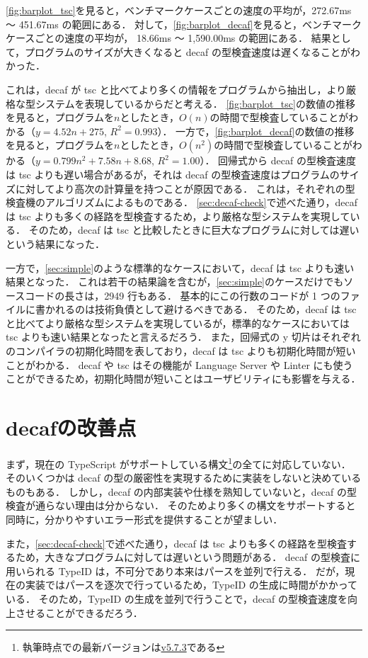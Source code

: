 \ref{fig:barplot_tsc}を見ると，ベンチマークケースごとの速度の平均が，272.67ms 〜 451.67ms の範囲にある．
対して，\ref{fig:barplot_decaf}を見ると，ベンチマークケースごとの速度の平均が， 18.66ms 〜 1,590.00ms の範囲にある．
結果として，プログラムのサイズが大きくなると decaf の型検査速度は遅くなることがわかった．

これは，decaf が tsc と比べてより多くの情報をプログラムから抽出し，より厳格な型システムを表現しているからだと考える．
\ref{fig:barplot_tsc}の数値の推移を見ると，プログラムを$n$としたとき，$O(n)$の時間で型検査していることがわかる（$y = 4.52n + 275$, $R^2 = 0.993$）．
一方で，\ref{fig:barplot_decaf}の数値の推移を見ると，プログラムを$n$としたとき，$O(n^2)$の時間で型検査していることがわかる（$y = 0.799n^2 + 7.58n + 8.68$, $R^2 = 1.00$）．
回帰式から decaf の型検査速度は tsc よりも遅い場合があるが，それは decaf の型検査速度はプログラムのサイズに対してより高次の計算量を持つことが原因である．
これは，それぞれの型検査機のアルゴリズムによるものである．
\ref{sec:decaf-check}で述べた通り，decaf は tsc よりも多くの経路を型検査するため，より厳格な型システムを実現している．
そのため，decaf は tsc と比較したときに巨大なプログラムに対しては遅いという結果になった．

一方で，\ref{sec:simple}のような標準的なケースにおいて，decaf は tsc よりも速い結果となった．
これは若干の結果論を含むが，\ref{sec:simple}のケースだけでもソースコードの長さは，2949 行もある．
基本的にこの行数のコードが 1 つのファイルに書かれるのは技術負債として避けるべきである．
そのため，decaf は tsc と比べてより厳格な型システムを実現しているが，標準的なケースにおいては tsc よりも速い結果となったと言えるだろう．
また，回帰式の y 切片はそれぞれのコンパイラの初期化時間を表しており，decaf は tsc よりも初期化時間が短いことがわかる．
decaf や tsc はその機能が Language Server や Linter にも使うことができるため，初期化時間が短いことはユーザビリティにも影響を与える．

\section{decafの改善点}

まず，現在の TypeScript がサポートしている構文\footnote{執筆時点での最新バージョンは\href{https://github.com/microsoft/TypeScript/tree/v5.7.3}{v5.7.3}である}の全てに対応していない．
そのいくつかは decaf の型の厳密性を実現するために実装をしないと決めているものもある．
しかし，decaf の内部実装や仕様を熟知していないと，decaf の型検査が通らない理由は分からない．
そのためより多くの構文をサポートすると同時に，分かりやすいエラー形式を提供することが望ましい．

また，\ref{sec:decaf-check}で述べた通り，decaf は tsc よりも多くの経路を型検査するため，大きなプログラムに対しては遅いという問題がある．
decaf の型検査に用いられる TypeID は，不可分であり本来はパースを並列で行える．
だが，現在の実装ではパースを逐次で行っているため，TypeID の生成に時間がかかっている．
そのため，TypeID の生成を並列で行うことで，decaf の型検査速度を向上させることができるだろう．
